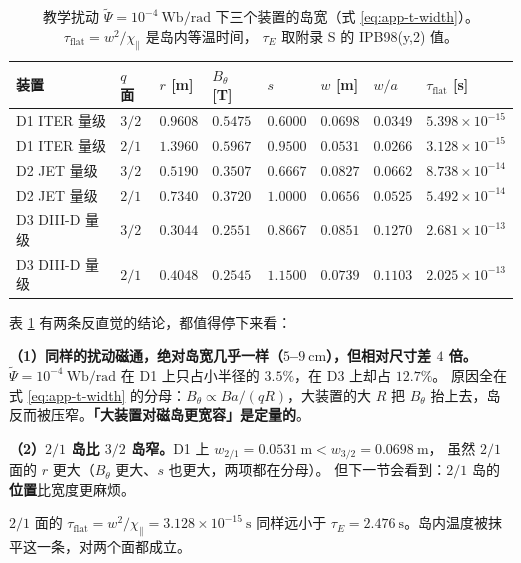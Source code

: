 \begin{table}[htbp]
  \centering
  \caption{教学扰动 $\tilde\Psi=10^{-4}\ \mathrm{Wb/rad}$ 下三个装置的岛宽（式
    \eqref{eq:app-t-width}）。$\tau_{\mathrm{flat}}=w^2/\chi_\parallel$ 是岛内等温时间，
    $\tau_E$ 取附录 S 的 IPB98(y,2) 值。}
  \label{tab:app-t-w}
  \begin{tabular}{@{}p{3.0cm}p{1.4cm}p{1.6cm}p{1.7cm}p{1.5cm}p{1.6cm}p{1.4cm}p{2.4cm}@{}}
    \toprule
    装置 & $q$ 面 & $r$ [m] & $B_\theta$ [T] & $s$ & $w$ [m] & $w/a$ & $\tau_{\mathrm{flat}}$ [s] \\
    \midrule
    D1 ITER 量级 & $3/2$ & $0.9608$ & $0.5475$ & $0.6000$ & $0.0698$ & $0.0349$ & $5.398\times10^{-15}$ \\
    D1 ITER 量级 & $2/1$ & $1.3960$ & $0.5967$ & $0.9500$ & $0.0531$ & $0.0266$ & $3.128\times10^{-15}$ \\
    D2 JET 量级 & $3/2$ & $0.5190$ & $0.3507$ & $0.6667$ & $0.0827$ & $0.0662$ & $8.738\times10^{-14}$ \\
    D2 JET 量级 & $2/1$ & $0.7340$ & $0.3720$ & $1.0000$ & $0.0656$ & $0.0525$ & $5.492\times10^{-14}$ \\
    D3 DIII-D 量级 & $3/2$ & $0.3044$ & $0.2551$ & $0.8667$ & $0.0851$ & $0.1270$ & $2.681\times10^{-13}$ \\
    D3 DIII-D 量级 & $2/1$ & $0.4048$ & $0.2545$ & $1.1500$ & $0.0739$ & $0.1103$ & $2.025\times10^{-13}$ \\
    \bottomrule
  \end{tabular}
\end{table}

表 \ref{tab:app-t-w} 有两条反直觉的结论，都值得停下来看：

\textbf{（1）同样的扰动磁通，绝对岛宽几乎一样（$5$--$9\ \mathrm{cm}$），但相对尺寸差 $4$ 倍。}
$\tilde\Psi=10^{-4}\ \mathrm{Wb/rad}$ 在 D1 上只占小半径的 $3.5\%$，在 D3 上却占 $12.7\%$。
原因全在式 \eqref{eq:app-t-width} 的分母：$B_\theta\propto B a/(qR)$，大装置的大 $R$
把 $B_\theta$ 抬上去，岛反而被压窄。\textbf{「大装置对磁岛更宽容」是定量的}。

\textbf{（2）$2/1$ 岛比 $3/2$ 岛窄。}D1 上 $w_{2/1}=0.0531\ \mathrm{m}<w_{3/2}=0.0698\ \mathrm{m}$，
虽然 $2/1$ 面的 $r$ 更大（$B_\theta$ 更大、$s$ 也更大，两项都在分母）。
但下一节会看到：$2/1$ 岛的\textbf{位置}比宽度更麻烦。

$2/1$ 面的 $\tau_{\mathrm{flat}}=w^2/\chi_\parallel=3.128\times10^{-15}\ \mathrm{s}$
同样远小于 $\tau_E=2.476\ \mathrm{s}$。岛内温度被抹平这一条，对两个面都成立。

